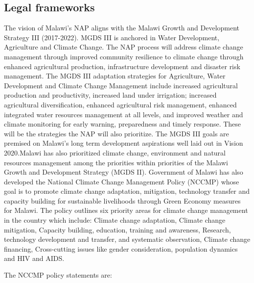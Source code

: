 \documentclass[
]{book}
\begin{document}
\hypertarget{legal-frameworks}{%
\subsection{Legal frameworks}\label{legal-frameworks}}

The vision of Malawi's NAP aligns with the Malawi Growth and Development Strategy III (2017-2022). MGDS III is anchored in Water Development, Agriculture and
Climate Change. The NAP process will address climate change management through improved community resilience to climate change through enhanced agricultural
production, infrastructure development and disaster risk management. The MGDS III adaptation strategies for Agriculture, Water Development and Climate Change
Management include increased agricultural production and productivity, increased land under irrigation; increased agricultural diversification, enhanced
agricultural risk management, enhanced integrated water resources management at all levels, and improved weather and climate monitoring for early warning,
preparedness and timely response. These will be the strategies the NAP will also prioritize. The MGDS III goals are premised on Malawi's long term development
aspirations well laid out in Vision 2020.Malawi has also prioritized climate change, environment and natural resources management among the priorities within
priorities of the Malawi Growth and Development Strategy (MGDS II). Government of Malawi has also developed the National Climate Change Management Policy (NCCMP)
whose goal is to promote climate change adaptation, mitigation, technology transfer and capacity building for sustainable livelihoods through Green Economy
measures for Malawi. The policy outlines six priority areas for climate change management in the country which include: Climate change adaptation, Climate change
mitigation, Capacity building, education, training and awareness, Research, technology development and transfer, and systematic observation, Climate change
financing, Cross-cutting issues like gender consideration, population dynamics and HIV and AIDS.

The NCCMP policy statements are:
\end{document}
